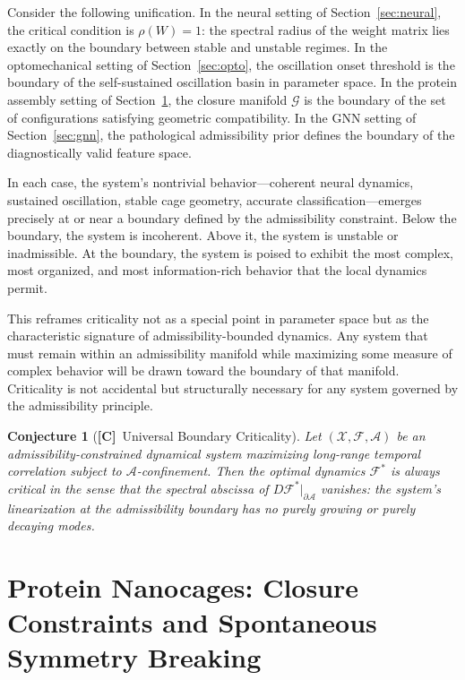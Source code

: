 \documentclass[11pt, oneside]{article}
\numberwithin{equation}{section}
\newcommand{\ClaimC}{\textcolor{rsvpgray!50}{\textbf{[C]}}}
\theoremstyle{rsvpstyle}
\newtheorem{conjecture}[theorem]{Conjecture}
\theoremstyle{remark}
\newcommand{\Adm}{\mathcal{A}}
\begin{document}
Consider the following unification. In the neural setting of
Section~\ref{sec:neural}, the critical condition is $\rho(W) = 1$: the spectral
radius of the weight matrix lies exactly on the boundary between stable and unstable
regimes. In the optomechanical setting of Section~\ref{sec:opto}, the oscillation
onset threshold is the boundary of the self-sustained oscillation basin in parameter
space. In the protein assembly setting of Section~\ref{sec:nano}, the closure manifold
$\mathcal{G}$ is the boundary of the set of configurations satisfying geometric
compatibility. In the GNN setting of Section~\ref{sec:gnn}, the pathological
admissibility prior defines the boundary of the diagnostically valid feature space.

In each case, the system's nontrivial behavior---coherent neural dynamics, sustained
oscillation, stable cage geometry, accurate classification---emerges precisely at or
near a boundary defined by the admissibility constraint. Below the boundary, the
system is incoherent. Above it, the system is unstable or inadmissible. At the
boundary, the system is poised to exhibit the most complex, most organized, and most
information-rich behavior that the local dynamics permit.

This reframes criticality not as a special point in parameter space but as the
characteristic signature of admissibility-bounded dynamics. Any system that must
remain within an admissibility manifold while maximizing some measure of complex
behavior will be drawn toward the boundary of that manifold. Criticality is not
accidental but structurally necessary for any system governed by the admissibility
principle.

\begin{conjecture}[\ClaimC\ Universal Boundary Criticality]
\label{conj:criticality}
Let $(\mathcal{X}, \mathcal{F}, \Adm)$ be an admissibility-constrained dynamical
system maximizing long-range temporal correlation subject to $\Adm$-confinement.
Then the optimal dynamics $\mathcal{F}^*$ is always critical in the sense that the
spectral abscissa of $D\mathcal{F}^*|_{\partial\Adm}$ vanishes: the system's
linearization at the admissibility boundary has no purely growing or purely decaying
modes.
\end{conjecture}

\section{Protein Nanocages: Closure Constraints and Spontaneous Symmetry Breaking}
\label{sec:nano}
\end{document}
